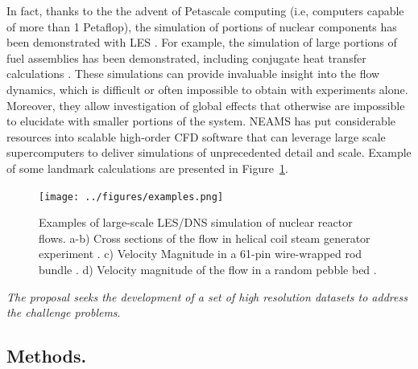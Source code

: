 \documentclass[11pt,letterpaper,english]{article}
\begin{document}
In fact, thanks to the the advent of Petascale computing (i.e, computers capable of more than 1 Petaflop), the simulation of portions of nuclear components has been demonstrated with LES \cite{merzari2017large}. For example, the simulation of large portions of fuel assemblies has been demonstrated, including conjugate heat transfer calculations \cite{obabko2019}. These simulations can provide invaluable insight into the flow dynamics, which is difficult or often impossible to obtain with experiments alone. Moreover, they allow investigation of global effects that otherwise are impossible to elucidate with smaller portions of the system. NEAMS has put considerable resources into scalable high-order CFD software that can leverage large scale supercomputers to deliver simulations of unprecedented detail and scale. Example of some landmark calculations are presented in Figure~\ref{f:examples}.

\begin{figure}[!ht]
\centering
\texttt{[image: ../figures/examples.png]}
\caption{Examples of large-scale LES/DNS simulation of nuclear reactor flows. a-b) Cross sections of the flow in helical coil steam generator experiment \cite{alper2018}. c) Velocity Magnitude in a 61-pin wire-wrapped rod bundle \cite{goth2018comparison}. d) Velocity magnitude of the flow in a random pebble bed \cite{yuan2019}.}
\label{f:examples}
\end{figure}

\textit{The proposal seeks the development of a set of high resolution datasets to address the challenge problems}.

\vspace{-.25in}
\subsection{Methods.}
\vspace{-.2in}
\end{document}
